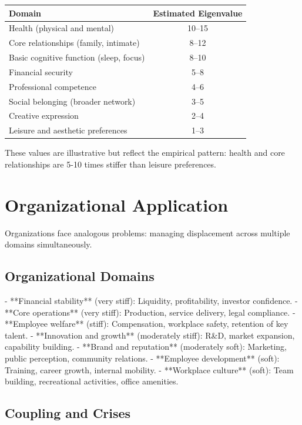 \documentclass[12pt]{article}
\begin{document}
\begin{table}[h]
\centering
\begin{tabular}{lc}
Domain & Estimated Eigenvalue \\
\hline
Health (physical and mental) & 10--15 \\
Core relationships (family, intimate) & 8--12 \\
Basic cognitive function (sleep, focus) & 8--10 \\
Financial security & 5--8 \\
Professional competence & 4--6 \\
Social belonging (broader network) & 3--5 \\
Creative expression & 2--4 \\
Leisure and aesthetic preferences & 1--3 \\
\hline
\end{tabular}
\end{table}

These values are illustrative but reflect the empirical pattern: health and core relationships are 5-10 times stiffer than leisure preferences.

\section{Organizational Application}

Organizations face analogous problems: managing displacement across multiple domains simultaneously.

\subsection{Organizational Domains}

- **Financial stability** (very stiff): Liquidity, profitability, investor confidence.
- **Core operations** (very stiff): Production, service delivery, legal compliance.
- **Employee welfare** (stiff): Compensation, workplace safety, retention of key talent.
- **Innovation and growth** (moderately stiff): R&D, market expansion, capability building.
- **Brand and reputation** (moderately soft): Marketing, public perception, community relations.
- **Employee development** (soft): Training, career growth, internal mobility.
- **Workplace culture** (soft): Team building, recreational activities, office amenities.

\subsection{Coupling and Crises}
\end{document}
